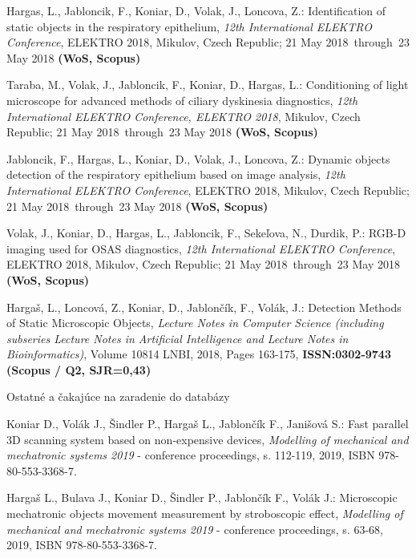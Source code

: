 \noindent Hargas, L., Jabloncik, F., Koniar, D., Volak, J., Loncova, Z.: Identification of static objects in the respiratory epithelium, \textit{12th International ELEKTRO Conference}, ELEKTRO 2018, Mikulov, Czech Republic; 21 May 2018 through 23 May 2018 \textbf{(WoS, Scopus)} \newline

\noindent Taraba, M., Volak, J., Jabloncik, F., Koniar, D., Hargas, L.: Conditioning of light microscope for advanced methods of ciliary dyskinesia diagnostics, \textit{12th International ELEKTRO Conference, ELEKTRO 2018}, Mikulov, Czech Republic; 21 May 2018 through 23 May 2018 \textbf{(WoS, Scopus)} \newline

\noindent Jabloncik, F., Hargas, L., Koniar, D., Volak, J., Loncova, Z.: Dynamic objects detection of the respiratory epithelium based on image analysis, \textit{12th International ELEKTRO Conference}, ELEKTRO 2018, Mikulov, Czech Republic; 21 May 2018 through 23 May 2018 \textbf{(WoS, Scopus)} \newline

\noindent Volak, J., Koniar, D., Hargas, L., Jabloncik, F., Sekeľova, N., Durdik, P.: RGB-D imaging used for OSAS diagnostics, \textit{12th International ELEKTRO Conference}, ELEKTRO 2018, Mikulov, Czech Republic; 21 May 2018 through 23 May 2018 \textbf{(WoS, Scopus)} \newline

\noindent Hargaš, L., Loncová, Z., Koniar, D., Jablončík, F., Volák, J.: Detection Methods of Static Microscopic Objects, \textit{Lecture Notes in Computer Science (including subseries Lecture Notes in Artificial Intelligence and Lecture Notes in Bioinformatics)}, Volume 10814 LNBI, 2018, Pages 163-175, \textbf{ISSN:0302-9743 (Scopus / Q2, SJR=0,43)} \newline

\newpage
\begin{center}
	\LARGE Ostatné a čakajúce na zaradenie do databázy 
\end{center}

\noindent Koniar D., Volák J., Šindler P., Hargaš L., Jablončík F., Janišová S.: Fast parallel 3D scanning system based on non-expensive devices, \textit{Modelling of mechanical and mechatronic systems 2019} - conference proceedings, s. 112-119, 2019, ISBN 978-80-553-3368-7. \newline

\noindent Hargaš L., Bulava J., Koniar D., Šindler P., Jablončík F., Volák J.: Microscopic mechatronic objects movement measurement by stroboscopic effect, \textit{Modelling of mechanical and mechatronic systems 2019} - conference proceedings, s. 63-68, 2019, ISBN 978-80-553-3368-7. \newline

